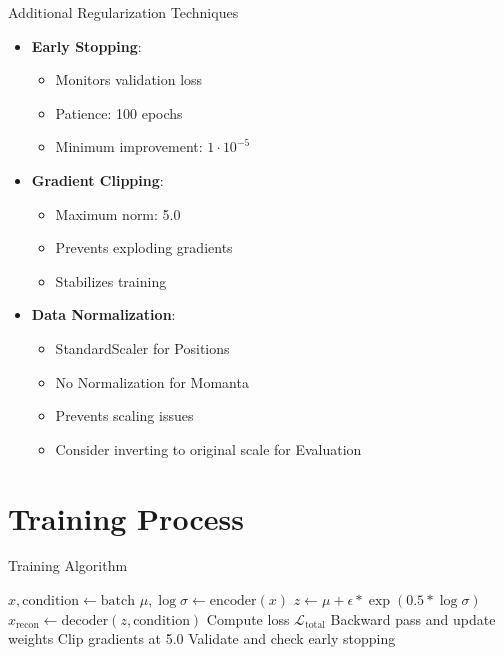 \documentclass{beamer}
\begin{document}
\begin{frame}{Additional Regularization Techniques}
    \begin{itemize}
        \item \textbf{Early Stopping}:
        \begin{itemize}
            \item Monitors validation loss
            \item Patience: 100 epochs
            \item Minimum improvement: $1 \cdot 10^{-5}$
        \end{itemize}
        \item \textbf{Gradient Clipping}:
        \begin{itemize}
            \item Maximum norm: 5.0
            \item Prevents exploding gradients
            \item Stabilizes training
        \end{itemize}
        \item \textbf{Data Normalization}:
        \begin{itemize}
            \item StandardScaler for Positions
            \item No Normalization for Momanta
            \item Prevents scaling issues
            \item Consider inverting to original scale for Evaluation
        \end{itemize}
    \end{itemize}
\end{frame}

\section{Training Process}

\begin{frame}{Training Algorithm}
    \begin{algorithm}[H]
    \caption{CVAE Training Process}
    \begin{algorithmic}[1]
                \State $x, \text{condition} \gets \text{batch}$
                \State $\mu, \log\sigma \gets \text{encoder}(x)$
                \State $z \gets \mu + \epsilon * \exp(0.5 * \log\sigma)$
                \State $x_{\text{recon}} \gets \text{decoder}(z, \text{condition})$
                \State Compute loss $\mathcal{L}_{\text{total}}$
                \State Backward pass and update weights
                \State Clip gradients at 5.0
            \EndFor
            \State Validate and check early stopping
        \EndFor
    \end{algorithmic}
    \end{algorithm}
\end{frame}
\end{document}
